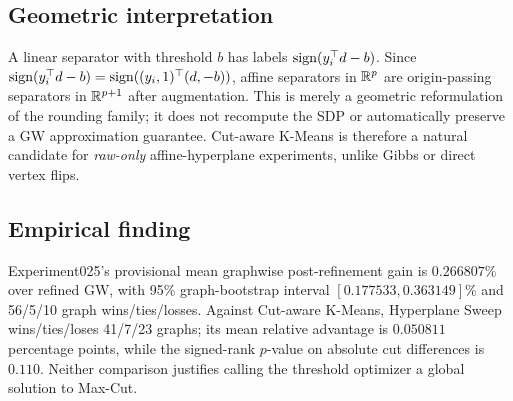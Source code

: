 \subsection{Geometric interpretation}
A linear separator with threshold $b$ has labels $\operatorname{sign}(y_i^\top d-b)$. Since
$\operatorname{sign}(y_i^\top d-b)=\operatorname{sign}((y_i,1)^\top(d,-b))$, affine separators in $\mathbb{R}^p$ are origin-passing separators in $\mathbb{R}^{p+1}$ after augmentation. This is merely a geometric reformulation of the rounding family; it does not recompute the SDP or automatically preserve a GW approximation guarantee. Cut-aware K-Means is therefore a natural candidate for \emph{raw-only} affine-hyperplane experiments, unlike Gibbs or direct vertex flips.

\subsection{Empirical finding}
Experiment025's provisional mean graphwise post-refinement gain is $0.266807\%$ over refined GW, with 95\% graph-bootstrap interval $[0.177533,0.363149]\%$ and 56/5/10 graph wins/ties/losses. Against Cut-aware K-Means, Hyperplane Sweep wins/ties/loses 41/7/23 graphs; its mean relative advantage is $0.050811$ percentage points, while the signed-rank $p$-value on absolute cut differences is $0.110$. Neither comparison justifies calling the threshold optimizer a global solution to Max-Cut.
